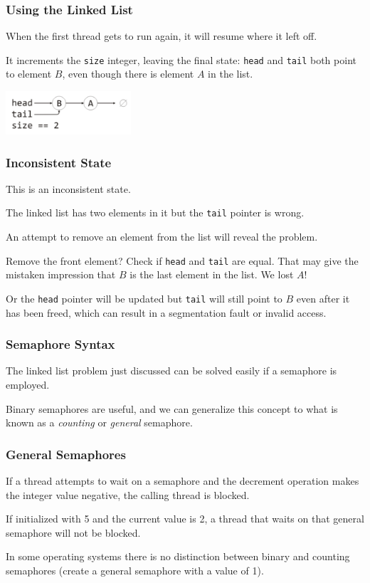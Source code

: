 \begin{frame}
	\frametitle{Using the Linked List}

	When the first thread gets to run again, it will resume where it left off.

	It increments the \texttt{size} integer, leaving the final state: \texttt{head} and \texttt{tail} both point to element $B$, even though there is element $A$ in the list.

	\begin{center}
		\includegraphics[width=0.35\textwidth]{images/linkedlist3.png}
	\end{center}


\end{frame}

\begin{frame}
	\frametitle{Inconsistent State}

	This is an \alert{inconsistent state}.

	The linked list has two elements in it but the \texttt{tail} pointer is wrong.

	An attempt to remove an element from the list will reveal the problem.

	Remove the front element? Check if \texttt{head} and \texttt{tail} are equal. That may give the mistaken impression that $B$ is the last element in the list. We lost $A$!

	Or the \texttt{head} pointer will be updated but \texttt{tail} will still point to $B$ even after it has been freed, which can result in a segmentation fault or invalid access.


\end{frame}

\begin{frame}
	\frametitle{Semaphore Syntax}

	The linked list problem just discussed can be solved easily if a semaphore is employed.

	Binary semaphores are useful, and we can generalize this concept to what is known as a \textit{counting} or \textit{general} semaphore.

\end{frame}


\begin{frame}
	\frametitle{General Semaphores}

	If a thread attempts to wait on a semaphore and the decrement operation makes the integer value negative, the calling thread is blocked.

	If initialized with 5 and the current value is 2, a thread that waits on that general semaphore will not be blocked.

	In some operating systems there is no distinction between binary and counting semaphores (create a general semaphore with a value of 1).

\end{frame}

